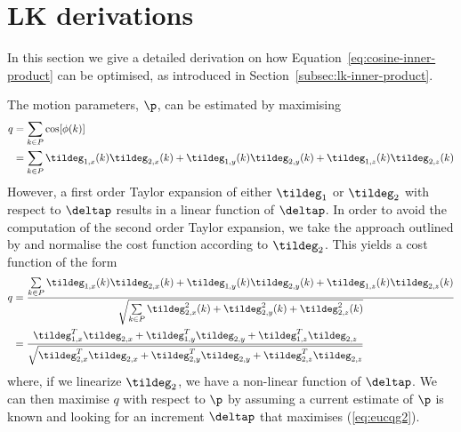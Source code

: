 \appendices
\section{LK derivations}
In this section we give a detailed derivation on how Equation~\ref{eq:cosine-inner-product} can be optimised, as introduced in Section~\ref{subsec:lk-inner-product}.

The motion parameters, $\p$, can be estimated by maximising
\begin{equation}
  \begin{aligned}\label{eq:eucq}
    q &= \sum \limits_{k \in P} \cos [\phi (k)] \\
      &= \sum \limits_{k \in P} \tildeg_{1,x}(k)\tildeg_{2,x}(k) + \tildeg_{1,y}(k)\tildeg_{2,y}(k) + \tildeg_{1,z}(k)\tildeg_{2,z}(k)
  \end{aligned}
\end{equation}
However, a first order Taylor expansion of either $\tildeg_1$ or $\tildeg_2$ with respect to $\deltap$ results in a linear function of $\deltap$. In order to avoid the computation of the second order Taylor expansion, we take the approach outlined by \cite{RefWorks:59} and normalise the cost function according to $\tildeg_2$. This yields a cost function of the form
\begin{equation}
  \begin{aligned}\label{eq:eucqg2}
    q &= \frac{\sum \limits_{k \in P} \tildeg_{1,x}(k)\tildeg_{2,x}(k) + \tildeg_{1,y}(k)\tildeg_{2,y}(k) + \tildeg_{1,z}(k)\tildeg_{2,z}(k)}{\sqrt{\sum \limits_{k \in P} \tildeg_{2,x}^2(k) + \tildeg_{2,y}^2(k) + \tildeg_{2,z}^2(k)}} \\
      &= \frac{\tildeg_{1,x}^T \tildeg_{2,x} + \tildeg_{1,y}^T \tildeg_{2,y} + \tildeg_{1,z}^T \tildeg_{2,z}}{\sqrt{\tildeg_{2,x}^T \tildeg_{2,x} + \tildeg_{2,y}^T \tildeg_{2,y} + \tildeg_{2,z}^T \tildeg_{2,z}}}
  \end{aligned}
\end{equation}
where, if we linearize $\tildeg_2$, we have a non-linear function of $\deltap$. We can then maximise $q$ with respect to $\p$ by assuming a current estimate of $\p$ is known and looking for an increment $\deltap$ that maximises (\ref{eq:eucqg2}).
